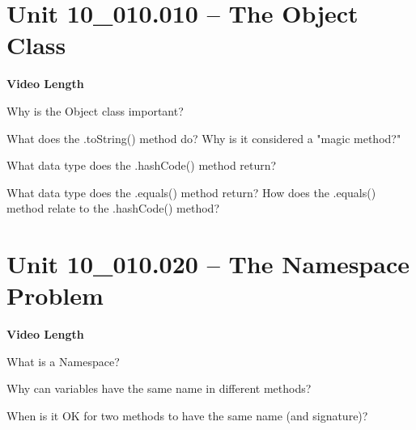 \documentclass[letterpaper,12pt]{exam}
\newcommand{\unit}{Unit 10}
\begin{document}
\section*{\unit\_010.010 -- The Object Class} 
\par{\selectfont\textbf{Video Length }}
\begin{questions}
\begin{samepage}
    \question Why is the Object class important?
    \vspace{5mm}
\end{samepage}
\begin{samepage}
    \question What does the .toString() method do?  Why is it considered a "magic method?"
    \vspace{5mm}
\end{samepage}

\begin{samepage}
    \question What data type does the .hashCode() method return?
    \vspace{5mm}
\end{samepage}

\begin{samepage}
    \question What data type does the .equals() method return?  How does the .equals() method relate to the .hashCode() method?
    \vspace{5mm}
\end{samepage}

\section*{\unit\_010.020 -- The Namespace Problem} 
\par{\selectfont\textbf{Video Length }}

\begin{samepage}
    \question What is a Namespace?
    \vspace{5mm}
\end{samepage}

\begin{samepage}
    \question Why can variables have the same name in different methods?
    \vspace{5mm}
\end{samepage}

\begin{samepage}
    \question When is it OK for two methods to have the same name (and signature)?
    \vspace{5mm}
\end{samepage}



\end{questions}
\end{document}
